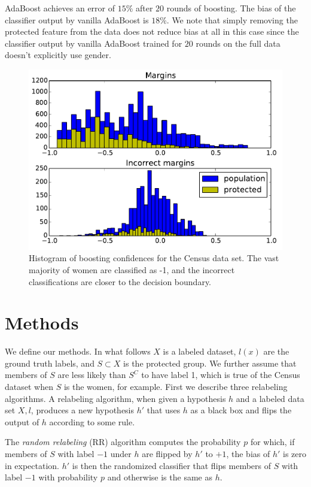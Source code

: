 \documentclass{article}
\begin{document}
AdaBoost achieves an error of $15\%$ after $20$ rounds of boosting.  The bias
of the classifier output by vanilla AdaBoost is $18\%$.  We note that simply
removing the protected feature from the data does not reduce bias at all in
this case since the classifier output by vanilla AdaBoost trained for $20$
rounds on the full data doesn't explicitly use gender.

\begin{figure}[t]
\centering
\includegraphics[width=\columnwidth]{images/censusmargins.pdf}
\caption{Histogram of boosting confidences for the Census data set. The vast
majority of women are classified as -1, and the incorrect classifications are
closer to the decision boundary.}
\label{fig:boosting-margins}
\end{figure}

\section{Methods} \label{sec:methods}

We define our methods. In what follows $X$ is a labeled dataset, $l(x)$ are the
ground truth labels, and $S \subset X$ is the protected group.  We further
assume that members of $S$ are less likely than $S^C$ to have label 1, which is
true of the Census dataset when $S$ is the women, for example.  First we
describe three relabeling algorithms.  A relabeling algorithm, when given a
hypothesis $h$ and a labeled data set $X, l$, produces a new hypothesis $h'$
that uses $h$ as a black box and flips the output of $h$ according to some
rule.

The \emph{random relabeling} (RR) algorithm computes the probability
$p$ for which, if members of $S$ with label $-1$ under $h$ are flipped by $h'$
to $+1$, the bias of $h'$ is zero in expectation.  $h'$ is then the randomized
classifier that flips members of $S$ with label $-1$ with probability $p$ and
otherwise is the same as $h$.
\end{document}

